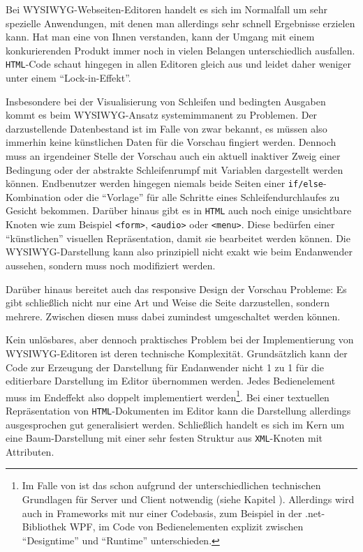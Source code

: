 Bei WYSIWYG-Webseiten-Editoren handelt es sich im Normalfall um sehr spezielle Anwendungen, mit denen man allerdings sehr schnell Ergebnisse erzielen kann. Hat man eine von Ihnen verstanden, kann der Umgang mit einem konkurierenden Produkt immer noch in vielen Belangen unterschiedlich ausfallen. \texttt{HTML}-Code schaut hingegen in allen Editoren gleich aus und leidet daher weniger unter einem "`Lock-in-Effekt"'.

Insbesondere bei der Visualisierung von Schleifen und bedingten Ausgaben kommt es beim WYSIWYG-Ansatz systemimmanent zu Problemen. Der darzustellende Datenbestand ist im Falle von \idename{} zwar bekannt, es müssen also immerhin keine künstlichen Daten für die Vorschau fingiert werden. Dennoch muss an irgendeiner Stelle der Vorschau auch ein aktuell inaktiver Zweig einer Bedingung oder der abstrakte Schleifenrumpf mit Variablen dargestellt werden können. Endbenutzer werden hingegen niemals beide Seiten einer \texttt{if/else}-Kombination oder die "`Vorlage"' für alle Schritte eines Schleifendurchlaufes zu Gesicht bekommen. Darüber hinaus gibt es in \texttt{HTML} auch noch einige unsichtbare Knoten wie zum Beispiel \texttt{<form>}, \texttt{<audio>} oder \texttt{<menu>}. Diese bedürfen einer "`künstlichen"' visuellen Repräsentation, damit sie bearbeitet werden können. Die WYSIWYG-Darstellung kann also prinzipiell nicht exakt wie beim Endanwender aussehen, sondern muss noch modifiziert werden.

Darüber hinaus bereitet auch das responsive Design der Vorschau Probleme: Es gibt schließlich nicht nur eine Art und Weise die Seite darzustellen, sondern mehrere. Zwischen diesen muss dabei zumindest umgeschaltet werden können.

Kein unlösbares, aber dennoch praktisches Problem bei der Implementierung von WYSIWYG-Editoren ist deren technische Komplexität. Grundsätzlich kann der Code zur Erzeugung der Darstellung für Endanwender nicht 1 zu 1 für die editierbare Darstellung im Editor übernommen werden. Jedes Bedienelement muss im Endeffekt also doppelt implementiert werden\footnote{Im Falle von \idename{} ist das schon aufgrund der unterschiedlichen technischen Grundlagen für Server und Client notwendig (siehe Kapitel ). Allerdings wird auch in Frameworks mit nur einer Codebasis, zum Beispiel in der .net-Bibliothek WPF, im Code von Bedienelementen explizit zwischen "`Designtime"' und "`Runtime"' unterschieden.}. Bei einer textuellen Repräsentation von \texttt{HTML}-Dokumenten im Editor kann die Darstellung allerdings ausgesprochen gut generalisiert werden. Schließlich handelt es sich im Kern um eine Baum-Darstellung mit einer sehr festen Struktur aus \texttt{XML}-Knoten mit Attributen.


